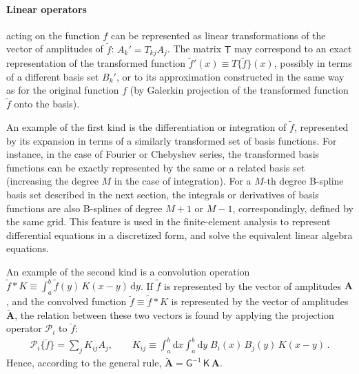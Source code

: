 \documentclass[12pt]{article}
\renewcommand{\d}{\mathrm{d}}
\let\oldparagraph\paragraph
\renewcommand{\paragraph}[1]{\vspace{-2mm}\oldparagraph{#1}}
\begin{document}
\paragraph{Linear operators} acting on the function $f$ can be represented as linear transformations of the vector of amplitudes of $\tilde f$: $A_k' = T_{kj} A_j$. The matrix $\mathsf T$ may correspond to an exact representation of the transformed function $\tilde f'(x) \equiv T\{\tilde f\}(x)$, possibly in terms of a different basis set $B_k'$, or to its approximation constructed in the same way as for the original function $f$ (by Galerkin projection of the transformed function $\tilde f$ onto the basis).

An example of the first kind is the differentiation or integration of $\tilde f$, represented by its expansion in terms of a similarly transformed set of basis functions. For instance, in the case of Fourier or Chebyshev series, the transformed basis functions can be exactly represented by the same or a related basis set (increasing the degree $M$ in the case of integration). For a $M$-th degree B-spline basis set described in the next section, the integrals or derivatives of basis functions are also B-splines of degree $M+1$ or $M-1$, correspondingly, defined by the same grid. This feature is used in the finite-element analysis to represent differential equations in a discretized form, and solve the equivalent linear algebra equations.

An example of the second kind is a convolution operation $\tilde f \ast K \equiv \int_a^b \tilde f(y)\, K(x-y)\, \d y$. If $\tilde f$ is represented by the vector of amplitudes $\boldsymbol A$, and the convolved function $\breve f \equiv \tilde f \ast K$ is represented by the vector of amplitudes $\boldsymbol{\breve A}$, the relation between these two vectors is found by applying the projection operator $\mathcal P_i$ to $\breve f$:
\begin{align}
\mathcal P_i \{ \breve f \} = \sum_j K_{ij} A_j, \qquad
K_{ij} \equiv \int_a^b \d x \int_a^b \d y\; B_i(x)\, B_j(y)\, K(x-y) \,.
\end{align}
Hence, according to the general rule, $\boldsymbol{\breve A} = \mathsf G^{-1} \, \mathsf K\, \boldsymbol A$.
\end{document}
